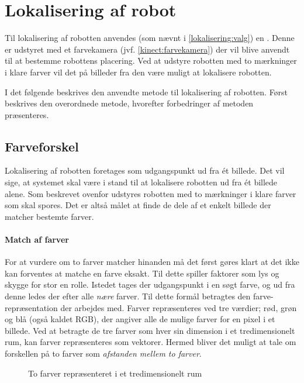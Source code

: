 \section{Lokalisering af robot}
Til lokalisering af robotten anvendes (som nævnt i \cref{lokalisering:valg}) en \kinect.
Denne er udstyret med et farvekamera (jvf. \cref{kinect:farvekamera}) der vil blive anvendt til at bestemme robottens placering.
Ved at udstyre robotten med to mærkninger i klare farver vil det på billeder fra den være muligt at lokalisere robotten.

I det følgende beskrives den anvendte metode til lokalisering af robotten.
Først beskrives den overordnede metode, hvorefter forbedringer af metoden præsenteres.

\subsection{Farveforskel}\label{tracking:colordiff}
Lokalisering af robotten foretages som udgangspunkt ud fra \'et billede.
Det vil sige, at systemet skal være i stand til at lokalisere robotten ud fra \'et billede alene.
Som beskrevet ovenfor udstyres robotten med to mærkninger i klare farver som skal spores.
Det er altså målet at finde de dele af et enkelt billede der matcher bestemte farver.

\paragraph{Match af farver}
For at vurdere om to farver matcher hinanden må det først gøres klart at det ikke kan forventes at matche en farve eksakt.
Til dette spiller faktorer som lys og skygge for stor en rolle.
Istedet tages der udgangspunkt i en søgt farve, og ud fra denne ledes der efter alle \textit{nære} farver.
Til dette formål betragtes den farve-repræsentation der arbejdes med.
Farver repræsenteres ved tre værdier; rød, grøn og blå (også kaldet RGB), der angiver alle de mulige farver for en pixel i et billede.
Ved at betragte de tre farver som hver sin dimension i et tredimensionelt rum, kan farver repræsenteres som vektorer.
Hermed bliver det muligt at tale om forskellen på to farver som \textit{afstanden mellem to farver}.

\begin{figure}
\centering

\caption{To farver repræsenteret i et tredimensionelt rum}
\label{tracking:colorspace}
\end{figure}

